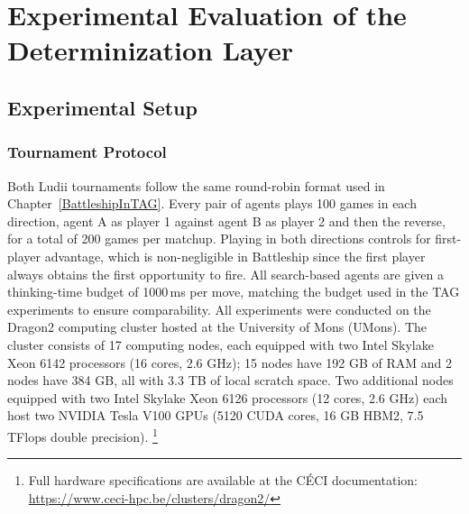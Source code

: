 \chapter{Experimental Evaluation of the Determinization Layer}
\label{ExperimentalEvaluation}

\begin{abstract}
This chapter evaluates the determinization layer proposed in Chapter~\ref{DeterminizationLayerLudii} through a series of controlled tournaments in Ludii on the Battleship benchmark. Two tournaments are conducted. The first uses native Ludii agents without any modification, empirically confirming the information leakage problem characterized in Chapter~\ref{HiddenInfoSimulationLudii}. The second replaces each search-based agent with its determinized counterpart and measures the impact of correct hidden-information handling on agent performance.

The results from both Ludii tournaments are then compared against the TAG reference benchmark established in Chapter~\ref{BattleshipInTAG}, examining whether the determinization layer successfully bridges the behavioral gap between the two frameworks and what residual differences remain.
\end{abstract}


\section{Experimental Setup}
\label{sec:results_setup}

\subsection{Tournament Protocol}

Both Ludii tournaments follow the same round-robin format used in Chapter~\ref{BattleshipInTAG}. Every pair of agents plays 100 games in each direction, agent A as player 1 against agent B as player 2 and then the reverse, for a total of 200 games per matchup. Playing in both directions controls for first-player advantage, which is non-negligible in Battleship since the first player always obtains the first opportunity to fire. All search-based agents are given a thinking-time budget of 1000\,ms per move, matching the budget used in the TAG experiments to ensure comparability. All experiments were conducted on the Dragon2 computing cluster hosted at the University of Mons (UMons). The cluster consists of 17 computing nodes, each equipped with two Intel Skylake Xeon 6142 processors 
(16 cores, 2.6 GHz); 15 nodes have 192 GB of RAM and 2 nodes have 
384 GB, all with 3.3 TB of local scratch space. Two additional nodes 
equipped with two Intel Skylake Xeon 6126 processors (12 cores, 
2.6 GHz) each host two NVIDIA Tesla V100 GPUs (5120 CUDA cores, 
16 GB HBM2, 7.5 TFlops double precision).%
\footnote{Full hardware specifications are available at the CÉCI 
documentation: \url{https://www.ceci-hpc.be/clusters/dragon2/}}

